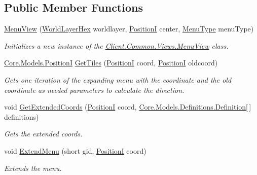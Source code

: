 \subsection*{Public Member Functions}
\begin{DoxyCompactItemize}
\item 
\hyperlink{classClient_1_1Common_1_1Views_1_1MenuView_a96e27ee46eb6e4fe839281c61a0c7b4a}{Menu\+View} (\hyperlink{classClient_1_1Common_1_1Views_1_1WorldLayerHex}{World\+Layer\+Hex} worldlayer, \hyperlink{classCore_1_1Models_1_1PositionI}{Position\+I} center, \hyperlink{classClient_1_1Common_1_1Views_1_1MenuView_a63db164d71105de8543e3992db8c9a1c}{Menu\+Type} menu\+Type)
\begin{DoxyCompactList}\small\item\em Initializes a new instance of the \hyperlink{classClient_1_1Common_1_1Views_1_1MenuView}{Client.\+Common.\+Views.\+Menu\+View} class. \end{DoxyCompactList}\item 
\hyperlink{classCore_1_1Models_1_1PositionI}{Core.\+Models.\+Position\+I} \hyperlink{classClient_1_1Common_1_1Views_1_1MenuView_a2d5b7057b1e79dca2236532d5dcf7f78}{Get\+Tiles} (\hyperlink{classCore_1_1Models_1_1PositionI}{Position\+I} coord, \hyperlink{classCore_1_1Models_1_1PositionI}{Position\+I} oldcoord)
\begin{DoxyCompactList}\small\item\em Gets one iteration of the expanding menu with the coordinate and the old coordinate as needed parameters to calculate the direction. \end{DoxyCompactList}\item 
void \hyperlink{classClient_1_1Common_1_1Views_1_1MenuView_ac4ec6daade1a30b3989f9ed77df78665}{Get\+Extended\+Coords} (\hyperlink{classCore_1_1Models_1_1PositionI}{Position\+I} coord, \hyperlink{classCore_1_1Models_1_1Definitions_1_1Definition}{Core.\+Models.\+Definitions.\+Definition}\mbox{[}$\,$\mbox{]} definitions)
\begin{DoxyCompactList}\small\item\em Gets the extended coords. \end{DoxyCompactList}\item 
void \hyperlink{classClient_1_1Common_1_1Views_1_1MenuView_abca68f27c340677a0fe7cfb410d8c71e}{Extend\+Menu} (short gid, \hyperlink{classCore_1_1Models_1_1PositionI}{Position\+I} coord)
\begin{DoxyCompactList}\small\item\em Extends the menu. \end{DoxyCompactList}\item 

\end{DoxyCompactItemize}
